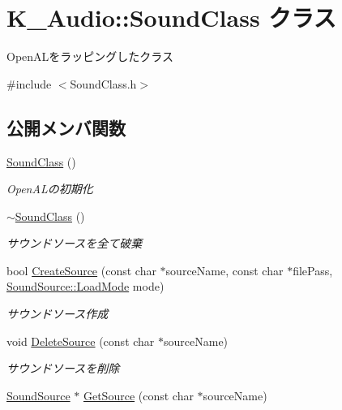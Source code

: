 \hypertarget{class_k___audio_1_1_sound_class}{}\section{K\+\_\+\+Audio\+:\+:Sound\+Class クラス}
\label{class_k___audio_1_1_sound_class}


Open\+A\+Lをラッピングしたクラス  




{\ttfamily \#include $<$Sound\+Class.\+h$>$}

\subsection*{公開メンバ関数}
\begin{DoxyCompactItemize}
\item 
\mbox{\hyperlink{class_k___audio_1_1_sound_class_a9aba0743522979791ed9e6fe0d39c942}{Sound\+Class}} ()
\begin{DoxyCompactList}\small\item\em Open\+A\+Lの初期化 \end{DoxyCompactList}\item 
\mbox{\hyperlink{class_k___audio_1_1_sound_class_ae2fe8f23da3db03d0fd664fc9dbb0caa}{$\sim$\+Sound\+Class}} ()
\begin{DoxyCompactList}\small\item\em サウンドソースを全て破棄 \end{DoxyCompactList}\item 
bool \mbox{\hyperlink{class_k___audio_1_1_sound_class_a0f86040076fd10b6eddab46c78cc5009}{Create\+Source}} (const char $\ast$source\+Name, const char $\ast$file\+Pass, \mbox{\hyperlink{class_k___audio_1_1_sound_source_ad0e58f4cea821bc4087ed13830b06f69}{Sound\+Source\+::\+Load\+Mode}} mode)
\begin{DoxyCompactList}\small\item\em サウンドソース作成 \end{DoxyCompactList}\item 
void \mbox{\hyperlink{class_k___audio_1_1_sound_class_ab7f65f8816604bdc37cb6e30671b2494}{Delete\+Source}} (const char $\ast$source\+Name)
\begin{DoxyCompactList}\small\item\em サウンドソースを削除 \end{DoxyCompactList}\item 
\mbox{\hyperlink{class_k___audio_1_1_sound_source}{Sound\+Source}} $\ast$ \mbox{\hyperlink{class_k___audio_1_1_sound_class_ab40ecce29808c35b2f37b29e36cf981d}{Get\+Source}} (const char $\ast$source\+Name)
\end{DoxyCompactItemize}


